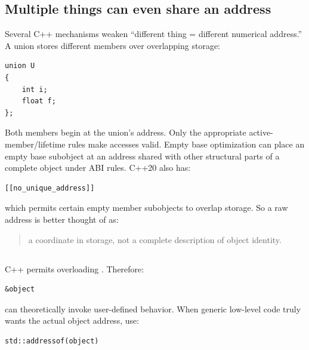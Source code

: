 \subsection{Multiple things can even share an address}\label{05-engine-i-ch002-multiple-things-can-even-share-an-address}

\hypertarget{05-engine-i-ch002-multiple-things-can-even-share-an-address}{}

Several C++ mechanisms weaken ``different thing = different numerical address.'' A union stores different members over overlapping storage:

\begin{verbatim}
union U
{
    int i;
    float f;
};
\end{verbatim}

Both members begin at the union's address. Only the appropriate active-member/lifetime rules make accesses valid. Empty base optimization can place an empty base subobject at an address shared with other structural parts of a complete object under ABI rules. C++20 also has:

\begin{verbatim}
[[no_unique_address]]
\end{verbatim}

which permits certain empty member subobjects to overlap storage. So a raw address is better thought of as:

\begin{quote}
a coordinate in storage, not a complete description of object identity.
\end{quote}

\subsection{\texorpdfstring{}{}}\label{05-engine-i-ch002-stdaddressof}

\hypertarget{05-engine-i-ch002-stdaddressof}{}

C++ permits overloading . Therefore:

\begin{verbatim}
&object
\end{verbatim}

can theoretically invoke user-defined behavior. When generic low-level code truly wants the actual object address, use:

\begin{verbatim}
std::addressof(object)
\end{verbatim}

